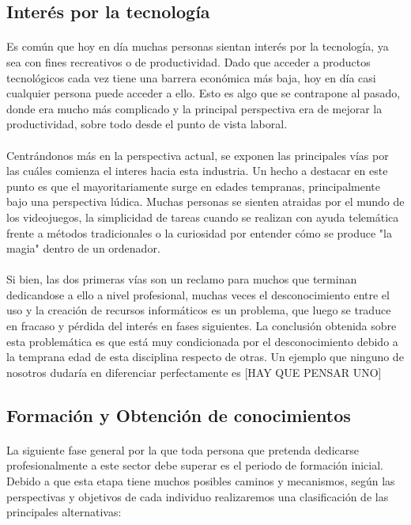 \documentclass[11pt, a4paper]{report}
\begin{document}
    	\subsection{Interés por la tecnología}
        	\paragraph{}
            Es común que hoy en día muchas personas sientan interés por la tecnología, ya sea con fines recreativos o de productividad. Dado que acceder a productos tecnológicos cada vez tiene una barrera económica más baja, hoy en día casi cualquier persona puede acceder a ello. Esto es algo que se contrapone al pasado, donde era mucho más complicado y la principal perspectiva era de mejorar la productividad, sobre todo desde el punto de vista laboral.
            
            \paragraph{}
			Centrándonos más en la perspectiva actual, se exponen las principales vías por las cuáles comienza el interes hacia esta industria. Un hecho a destacar en este punto es que el mayoritariamente surge en edades tempranas, principalmente bajo una perspectiva lúdica. Muchas personas se sienten atraidas por el mundo de los videojuegos, la simplicidad de tareas cuando se realizan con ayuda telemática frente a métodos tradicionales o la curiosidad por entender cómo se produce "la magia" dentro de un ordenador. 
            \paragraph{}
            Si bien, las dos primeras vías son un reclamo para muchos que terminan dedicandose a ello a nivel profesional, muchas veces el desconocimiento entre el uso y la creación de recursos informáticos es un problema, que luego se traduce en fracaso y pérdida del interés en fases siguientes. La conclusión obtenida sobre esta problemática es que está muy condicionada por el desconocimiento debido a la temprana edad de esta disciplina respecto de otras. Un ejemplo que ninguno de nosotros dudaría en diferenciar perfectamente es [HAY QUE PENSAR UNO]
 
        \subsection{Formación y Obtención de conocimientos}
        	\paragraph{}
            La siguiente fase general por la que toda persona que pretenda dedicarse profesionalmente a este sector debe superar es el periodo de formación inicial. Debido a que esta etapa tiene muchos posibles caminos y mecanismos, según las perspectivas y objetivos de cada individuo realizaremos una clasificación de las principales alternativas: 
            
\end{document}
